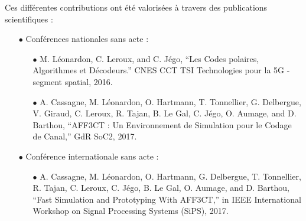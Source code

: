 \vspace{1cm}
Ces différentes contributions ont été valorisées à travers des publications scientifiques : \\

\begin{itemize}
		\item[$\bullet$] Conférences nationales sans acte :
	\begin{itemize}
		\item[$\bullet$] M. Léonardon, C. Leroux, and C. Jégo, “Les Codes polaires, Algorithmes et Décodeurs.”
		CNES CCT TSI Technologies pour la 5G - segment spatial, 2016.
     	\item[$\bullet$] A. Cassagne, M. Léonardon, O. Hartmann, T. Tonnellier, G. Delbergue, V. Giraud, C. Leroux, R. Tajan, B. Le Gal, C. Jégo, O. Aumage, and D. Barthou, “AFF3CT : Un Environnement de Simulation pour le Codage de Canal,” GdR SoC2, 2017.
	\end{itemize}

	\item[$\bullet$] Conférence internationale sans acte :
	\begin{itemize}
		\item[$\bullet$] A. Cassagne, M. Léonardon, O. Hartmann, G. Delbergue, T. Tonnellier, R. Tajan, C. Leroux, C. Jégo, B. Le Gal, O. Aumage, and D. Barthou, “Fast Simulation and Prototyping With AFF3CT,” in IEEE International Workshop on Signal Processing Systems (SiPS), 2017.
	\end{itemize}


\end{itemize}
